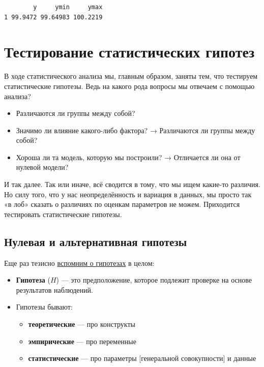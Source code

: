 \documentclass[
  letterpaper,
  DIV=11,
  numbers=noendperiod]{scrreprt}
\providecommand{\tightlist}{%
  \setlength{\itemsep}{0pt}\setlength{\parskip}{0pt}}\usepackage{longtable,booktabs,array}
\theoremstyle{definition}
\theoremstyle{remark}
\begin{document}
\begin{verbatim}
        y     ymin     ymax
1 99.9472 99.64983 100.2219
\end{verbatim}


\chapter{Тестирование статистических гипотез}\label{stats-testing}

В ходе статистического анализа мы, главным образом, заняты тем, что
тестируем статистические гипотезы. Ведь на какого рода вопросы мы
отвечаем с помощью анализа?

\begin{itemize}
\tightlist
\item
  Различаются ли группы между собой?
\item
  Значимо ли влияние какого-либо фактора? → Различаются ли группы между
  собой?
\item
  Хороша ли та модель, которую мы построили? → Отличается ли она от
  нулевой модели?
\end{itemize}

И так далее. Так или иначе, всё сводится в тому, что мы ищем какие-то
различия. Но силу того, что у нас неопределённость и вариация в данных,
мы просто так «в лоб» сказать о различиях по оценкам параметров не
можем. Приходится тестировать статистические гипотезы.

\section{Нулевая и альтернативная
гипотезы}\label{stats-testing-hyotheses}

Еще раз тезисно \hyperref[stats-hypotheses]{вспомним о гипотезах} в
целом:

\begin{itemize}
\tightlist
\item
  \textbf{Гипотеза} (\(H\)) --- это предположение, которое подлежит
  проверке на основе результатов наблюдений.
\item
  Гипотезы бывают:

  \begin{itemize}
  \tightlist
  \item
    \textbf{теоретические} --- про конструкты
  \item
    \textbf{эмпирические} --- про переменные
  \item
    \textbf{статистические} --- про параметры {[}генеральной
    совокупности{]} и данные
  \end{itemize}
\end{itemize}
\end{document}
